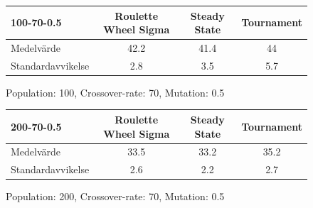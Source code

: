 \documentclass[titlepage, a4paper, 12pt]{article}
\begin{document}
\begin{figure}[H]
\begin{tabular}{lccc}
\hline
100-70-0.5 & Roulette Wheel Sigma & Steady State & Tournament \\
\hline
Medelvärde & 42.2 & 41.4 & 44 \\
Standardavvikelse & 2.8 & 3.5 & 5.7 \\
\hline
\end{tabular}
\caption{Population: 100, Crossover-rate: 70, Mutation: 0.5}\label{tab:mut05}
\end{figure}

\begin{figure}[H]
\begin{tabular}{lccc}
\hline
200-70-0.5 & Roulette Wheel Sigma & Steady State & Tournament \\
\hline
Medelvärde & 33.5 & 33.2 & 35.2 \\
Standardavvikelse & 2.6 & 2.2 & 2.7 \\
\hline
\end{tabular}
\caption{Population: 200, Crossover-rate: 70, Mutation: 0.5}\label{tab:pop200}
\end{figure}

\end{document}
